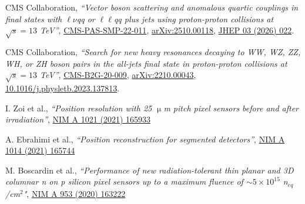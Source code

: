     \begin{refsection}
      \vspace{2mm}
      \onehalfspacing
CMS Collaboration, {\sl ``Vector boson scattering and anomalous quartic couplings in final states with $\ell\nu$qq or $\ell\ell$qq plus jets using proton-proton collisions at $\sqrt{s}=13$ TeV''},
\href{https://cds.cern.ch/record/2926224/files/SMP-22-011-pas.pdf}{CMS-PAS-SMP-22-011}, \href{http://arxiv.org/abs/arXiv:2510.00118}{arXiv:2510.00118}, 
\href{http://dx.doi.org/10.1007/JHEP03(2026)022}{JHEP 03 (2026) 022}.
    \end{refsection}


    \begin{refsection}
      \vspace{2mm}
      \onehalfspacing
CMS Collaboration, {\sl ``Search for new heavy resonances decaying to WW, WZ, ZZ, WH, or ZH boson pairs in the all-jets final state in proton-proton collisions at $\sqrt{s}=13$ TeV''},
\href{https://cds.cern.ch/record/2835154?ln=en}{CMS-B2G-20-009},
\href{https://arxiv.org/abs/2210.00043}{arXiv:2210.00043},
\href{http://dx.doi.org/10.1016/j.physletb.2023.137813}{10.1016/j.physletb.2023.137813}.
    \end{refsection}
    
    
     \begin{refsection}
      \vspace{2mm}
      \onehalfspacing
I. Zoi et al., {\sl ``Position resolution with 25 $\upmu$m pitch pixel sensors before and after irradiation''},  \href{https://www.sciencedirect.com/science/article/pii/S0168900221008962}{NIM A 1021 (2021) 165933}

    \end{refsection}

    \begin{refsection}
      \vspace{2mm}
      \onehalfspacing
A. Ebrahimi et al., {\sl ``Position reconstruction for segmented detectors''},  \href{https://www.sciencedirect.com/science/article/pii/S0168900221007294?via\%3Dihub}{NIM A 1014 (2021) 165744}

    \end{refsection}
    
    
     \begin{refsection}
      \vspace{2mm}
      \onehalfspacing
 M. Boscardin et al., {\em ``Performance of new radiation-tolerant thin planar and 3D columnar n on p silicon pixel sensors up to a maximum fluence of $\sim 5 \times 10^{15}$   n$_{eq}$/cm$^2$"}, \href{https://doi.org/10.1016/j.nima.2019.163222}{NIM A 953 (2020) 163222}
     \end{refsection}
     
